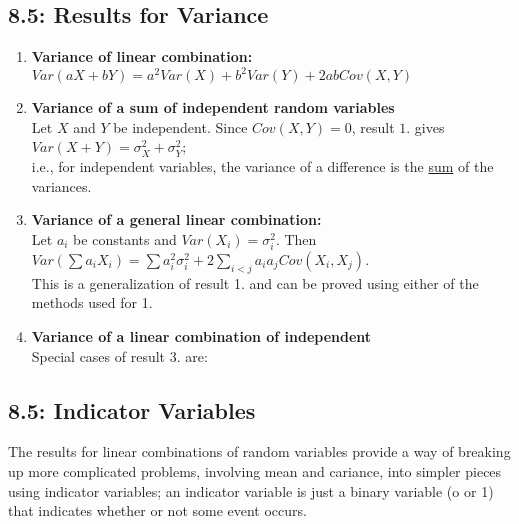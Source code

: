 \documentclass[11pt]{article}
\begin{document}
     \subsection*{8.5: Results for Variance}
     	\begin{enumerate}
     		\item {\bf Variance of linear combination:}\\
     		$Var(aX+bY)=a^2Var(X)+b^2Var(Y)+2abCov(X,Y)$
     		\item {\bf Variance of a sum of independent random variables}\\
     		Let $X$ and $Y$ be independent. Since $Cov(X,Y)=0$, result $1$. gives\\
     		$Var(X+Y)=\sigma^2_X+\sigma^2_Y$;\\
     		i.e., for independent variables, the variance of a difference is the \underline{sum} of the variances.\\
     		\item {\bf Variance of a general linear combination:}\\
     			Let $a_i$ be constants and $Var(X_i)=\sigma^2_i$. Then \\
     			$Var(\sum a_i X_i)=\sum a_i^2 \sigma_i^2 +2\sum_{i<j} a_ia_j Cov(X_i,X_j)	$.\\
   This is a generalization of result 1. and can be proved using either of the methods used for 1.\\
     			\item {\bf Variance of  a linear combination of independent}\\
     			Special cases of result 3. are:
     	
     	\end{enumerate}
     	
     	\subsection*{8.5: Indicator Variables}
     		The results for linear combinations of random variables provide a way of breaking up more complicated problems, involving mean and cariance, into simpler pieces using indicator variables; an indicator variable is just a binary variable (o or 1) that indicates whether or not some event occurs. 
\end{document}
